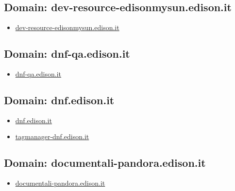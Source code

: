 \documentclass{article}
\begin{document}
    \subsection{Domain: dev-resource-edisonmysun.edison.it}
    \begin{itemize}
        
            
                
                \item \href{ https://dev-resource-edisonmysun.edison.it/}{ dev-resource-edisonmysun.edison.it }
            
        
    \end{itemize}

    \subsection{Domain: dnf-qa.edison.it}
    \begin{itemize}
        
            
                
                \item \href{ https://dnf-qa.edison.it/}{ dnf-qa.edison.it }
            
        
    \end{itemize}

    \subsection{Domain: dnf.edison.it}
    \begin{itemize}
        
            
                
                \item \href{ https://dnf.edison.it/}{ dnf.edison.it }
            
                
                \item \href{ http://tagmanager-dnf.edison.it/}{ tagmanager-dnf.edison.it }
            
        
    \end{itemize}

    \subsection{Domain: documentali-pandora.edison.it}
    \begin{itemize}
        
            
                
                \item \href{ http://documentali-pandora.edison.it/}{ documentali-pandora.edison.it }
            
        
    \end{itemize}
\end{document}
